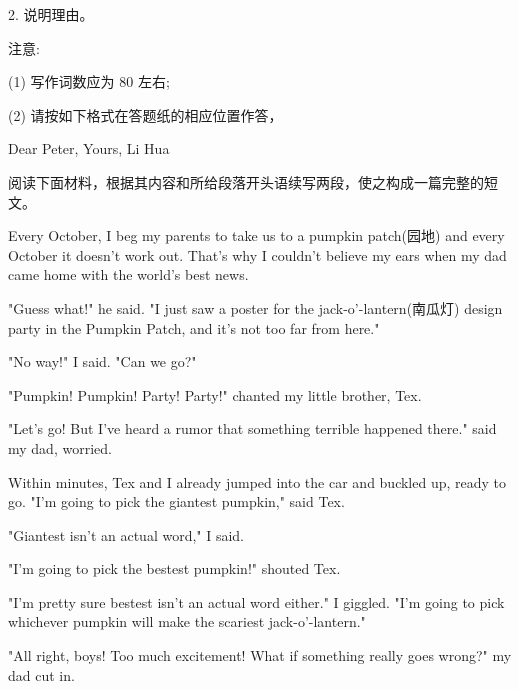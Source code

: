 \documentclass{英语试卷}
\begin{document}
\par 2. 说明理由。\par
\par 注意:\par
\par (1) 写作词数应为 80 左右;\par
\par (2) 请按如下格式在答题纸的相应位置作答，\par
\par Dear Peter, Yours, Li Hua\par
{}
\par 阅读下面材料，根据其内容和所给段落开头语续写两段，使之构成一篇完整的短文。\par
\par Every October, I beg my parents to take us to a pumpkin patch(园地) and every October it doesn't work out. That's why I couldn't believe my ears when my dad came home with the world's best news.\par
\par "Guess what!" he said. "I just saw a poster for the jack-o’-lantern(南瓜灯) design party in the Pumpkin Patch, and it’s not too far from here."\par
\par "No way!" I said. "Can we go?"\par
\par "Pumpkin! Pumpkin! Party! Party!" chanted my little brother, Tex.\par
\par "Let's go! But I've heard a rumor that something terrible happened there." said my dad, worried.\par
\par Within minutes, Tex and I already jumped into the car and buckled up, ready to go. "I'm going to pick the giantest pumpkin," said Tex.\par
\par "Giantest isn't an actual word," I said.\par
\par "I'm going to pick the bestest pumpkin!" shouted Tex.\par
\par "I'm pretty sure bestest isn't an actual word either." I giggled. "I'm going to pick whichever pumpkin will make the scariest jack-o'-lantern."\par
\par "All right, boys! Too much excitement! What if something really goes wrong?" my dad cut in.\par
\end{document}
